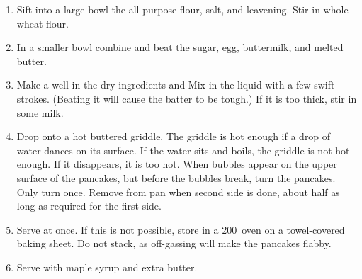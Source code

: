 
\begin{ingredients}
\end{ingredients}


\begin{recipe}
  \begin{enumerate}

  \item Sift into a large bowl the all-purpose flour, salt, and
    leavening.  Stir in whole wheat flour.

  \item In a smaller bowl combine and beat the sugar, egg, buttermilk,
    and melted butter.

  \item Make a well in the dry ingredients and Mix in the liquid with
    a few swift strokes.  (Beating it will cause the batter to be
    tough.)  If it is too thick, stir in some milk.

  \item Drop onto a hot buttered griddle.  The griddle is hot enough
    if a drop of water dances on its surface.  If the water sits and
    boils, the griddle is not hot enough.  If it disappears, it is too
    hot.  When bubbles appear on the upper surface of the pancakes,
    but before the bubbles break, turn the pancakes.  Only turn once.
    Remove from pan when second side is done, about half as long as
    required for the first side.

  \item Serve at once.  If this is not possible, store in a 200\F\
    oven on a towel-covered baking sheet.  Do not stack, as
    off-gassing will make the pancakes flabby.

  \item Serve with maple syrup and extra butter.

  \end{enumerate}
\end{recipe}
